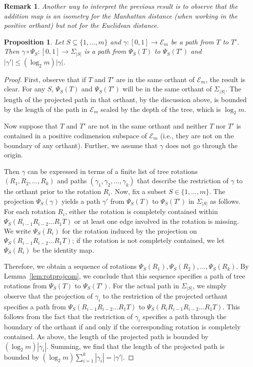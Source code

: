 \documentclass[a4paper,11pt]{article}
\newtheorem{proposition}[theorem]{Proposition}
\newtheorem{remark}[theorem]{Remark}
\newcommand{\aE}{\mathcal{E}}
\begin{document}
\begin{remark}
Another way to interpret the previous result is to observe that the addition map is an isometry for the Manhattan distance (when working in the positive orthant) but not for the Euclidean distance.
\end{remark}

\begin{proposition}\label{prop:projcont}
Let $S \subseteq \{1,\ldots,m\}$ and $\gamma \colon [0,1] \to \aE_m$ be a path from $T$ to $T'$.
Then $\gamma \circ \Psi_S \colon [0,1] \to \Sigma_{|S|}$ is a path from $\Psi_S(T)$ to $\Psi_S(T')$ and $|\gamma'| \leq (\log_2 m) |\gamma|$.
\end{proposition}

\begin{proof}
First, observe that if $T$ and $T'$ are in the same orthant of $\aE_m$, the result is clear.  For any $S$, $\Psi_S(T)$ and $\Psi_S(T')$ will be in the same orthant of $\Sigma_{|S|}$.  The length of the projected path in that orthant, by the discussion above, is bounded by the length of the path in $\aE_m$ scaled by the depth of the tree, which is $\log_2 m$.

Now suppose that $T$ and $T'$ are not in the same orthant and neither $T$ nor $T'$ is contained in a positive codimension subspace of $\aE_m$ (i.e., they are not on the boundary of any orthant).  
Further, we assume that $\gamma$ does not go through the origin. 

Then $\gamma$ can be expressed in terms of a finite list of tree rotations $(R_1, R_2, \ldots, R_k)$ and paths $(\gamma_1, \gamma_2, \ldots, \gamma_k)$ that describe the restriction of $\gamma$ to the orthant prior to the rotation $R_i$.
Now, fix a subset $S \in \{1,\ldots,m\}$.
The projection $\Psi_S(\gamma)$ yields a path $\gamma'$ from $\Psi_S(T)$ to $\Psi_S(T')$ in $\Sigma_{|S|}$ as follows.
For each rotation $R_i$, either the rotation is completely contained within $\Psi_S(R_{i-1} R_{i-2} \ldots R_1 T)$ or at least one edge involved in the rotation is missing.
We write $\Psi_S(R_i)$ for the rotation induced by the projection on $\Psi_S(R_{i-1} R_{i-2} \ldots R_1 T)$; if the rotation is not completely contained, we let $\Psi_S(R_i)$ be the identity map.

Therefore, we obtain a sequence of rotations $\Psi_S(R_1), \Psi_S(R_2), \ldots, \Psi_S(R_k)$.
By Lemma~\ref{lem:rotprojcom}, we conclude that this sequence specifies a path of tree rotations from $\Psi_S(T)$ to $\Psi_S(T')$.
For the actual path in $\Sigma_{|S|}$, we simply observe that the projection of $\gamma_i$ to the restriction of the projected orthant specifies a path from $\Psi_S(R_{i-1} R_{i-2} \ldots R_1 T)$ to $\Psi_S(R_i R_{i-1} R_{i-2} \ldots R_1 T)$.  This follows from the fact that the restriction of $\gamma_i$ specifies a path through the boundary of the orthant if and only if the corresponding rotation is completely contained.  As above, the length of the projected path is bounded by $(\log_2 m) |\gamma_i|$.  Summing, we find that the length of the projected path is bounded by $(\log_2 m) \sum_{i=1}^k |\gamma_i| = |\gamma'|$.


\end{proof}
\end{document}
